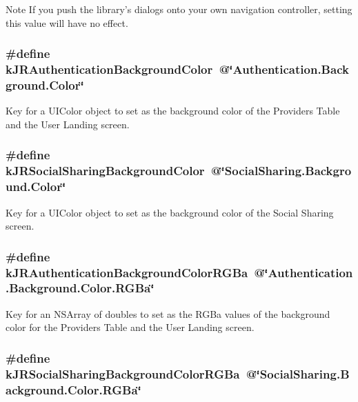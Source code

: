 \begin{DoxyNote}{Note}
If you push the library's dialogs onto your own navigation controller, setting this value will have no effect. 
\end{DoxyNote}
\hypertarget{group__custom_interface_gacfe014997457d27386eff69eb731ce0f}{
\subsubsection[{kJRAuthenticationBackgroundColor}]{\setlength{\rightskip}{0pt plus 5cm}\#define kJRAuthenticationBackgroundColor~@\char`\"{}Authentication.Background.Color\char`\"{}}}
\label{group__custom_interface_gacfe014997457d27386eff69eb731ce0f}
Key for a {\ttfamily UIColor} object to set as the background color of the Providers Table and the User Landing screen. \hypertarget{group__custom_interface_ga404751db179428ee64bbe2fda663efa6}{
\subsubsection[{kJRSocialSharingBackgroundColor}]{\setlength{\rightskip}{0pt plus 5cm}\#define kJRSocialSharingBackgroundColor~@\char`\"{}SocialSharing.Background.Color\char`\"{}}}
\label{group__custom_interface_ga404751db179428ee64bbe2fda663efa6}
Key for a {\ttfamily UIColor} object to set as the background color of the Social Sharing screen. \hypertarget{group__custom_interface_gae0c84a976949aa4eccecc123786efb3c}{
\subsubsection[{kJRAuthenticationBackgroundColorRGBa}]{\setlength{\rightskip}{0pt plus 5cm}\#define kJRAuthenticationBackgroundColorRGBa~@\char`\"{}Authentication.Background.Color.RGBa\char`\"{}}}
\label{group__custom_interface_gae0c84a976949aa4eccecc123786efb3c}
Key for an {\ttfamily NSArray} of doubles to set as the RGBa values of the background color for the Providers Table and the User Landing screen. \hypertarget{group__custom_interface_ga6554a101f0e2e9474a77262143dc528b}{
\subsubsection[{kJRSocialSharingBackgroundColorRGBa}]{\setlength{\rightskip}{0pt plus 5cm}\#define kJRSocialSharingBackgroundColorRGBa~@\char`\"{}SocialSharing.Background.Color.RGBa\char`\"{}}}
